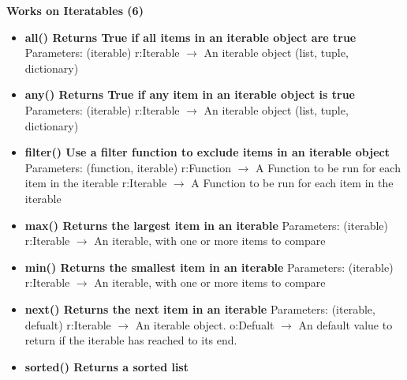 \documentclass{report}
\begin{document}
      \begin{center}
        \textbf{Works on Iteratables (6)}
      \end{center}
      \begin{itemize}
        \item[\ding{43}] \textbf{all()	Returns True if all items in an iterable object are true}
          \smallbreak \noindent
          Parameters: (iterable)
          \smallbreak \noindent
          r:Iterable $\rightarrow$ 	An iterable object (list, tuple, dictionary)
          \smallbreak \noindent
        \item[\ding{43}] \textbf{any()	Returns True if any item in an iterable object is true}
          \smallbreak \noindent
          Parameters: (iterable)
          \smallbreak \noindent
          r:Iterable $\rightarrow$ An iterable object (list, tuple, dictionary)
          \smallbreak \noindent
        \item[\ding{43}] \textbf{filter()	Use a filter function to exclude items in an iterable object}
          \smallbreak \noindent
          Parameters: (function, iterable)
          \smallbreak \noindent
          r:Function $\rightarrow$ A Function to be run for each item in the iterable
          \smallbreak \noindent
          r:Iterable $\rightarrow$ A Function to be run for each item in the iterable
          \smallbreak \noindent
        \item[\ding{43}] \textbf{max()	Returns the largest item in an iterable}
          \smallbreak \noindent
          Parameters: (iterable)
          \smallbreak \noindent
          r:Iterable $\rightarrow$ An iterable, with one or more items to compare
          \smallbreak \noindent
        \item[\ding{43}] \textbf{min()	Returns the smallest item in an iterable}
          \smallbreak \noindent
          Parameters: (iterable)
          \smallbreak \noindent
          r:Iterable $\rightarrow$ An iterable, with one or more items to compare
          \smallbreak \noindent
        \item[\ding{43}] \textbf{next()	Returns the next item in an iterable}
          \smallbreak \noindent
          Parameters: (iterable, defualt)
          \smallbreak \noindent
          r:Iterable $\rightarrow$ An iterable object.
          \smallbreak \noindent
          o:Defualt $\rightarrow$ An default value to return if the iterable has reached to its end.
          \smallbreak \noindent
        \item[\ding{43}] \textbf{sorted()	Returns a sorted list}

\end{itemize}
\end{document}
